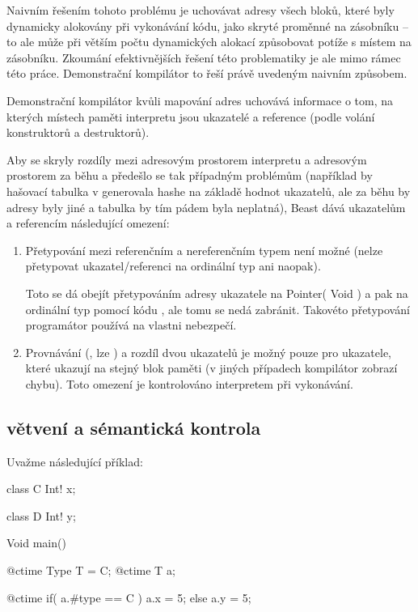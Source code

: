 Naivním řešením tohoto problému je uchovávat adresy všech bloků, které byly dynamicky alokovány při vykonávání \ctime kódu, jako skryté proměnné na zásobníku -- to ale může při větším počtu dynamických alokací způsobovat potíže s místem na zásobníku. Zkoumání efektivnějších řešení této problematiky je ale mimo rámec této práce. Demonstrační kompilátor to řeší právě uvedeným naivním způsobem.

Demonstrační kompilátor kvůli mapování adres uchovává informace o tom, na kterých místech paměti interpretu jsou ukazatelé a reference (podle volání konstruktorů a destruktorů). 

Aby se skryly rozdíly mezi adresovým prostorem interpretu a adresovým prostorem za běhu a předešlo se tak případným problémům (například by hašovací tabulka v \ctime generovala hashe na základě hodnot ukazatelů, ale za běhu by adresy byly jiné a tabulka by tím pádem byla neplatná), Beast dává \ctime ukazatelům a referencím následující omezení:
\begin{enumerate}
	\item Přetypování mezi referenčním a nereferenčním typem není možné (nelze přetypovat ukazatel/referenci na ordinální typ ani naopak).
	
	Toto se dá obejít přetypováním adresy ukazatele na Pointer( Void ) a pak na ordinální typ pomocí kódu , ale tomu se nedá zabránit. Takovéto přetypování programátor používá na vlastni nebezpečí.
	
	\item Provnávání (\inlineCode{< > <= >=}, lze ) a rozdíl dvou ukazatelů je možný pouze pro ukazatele, které ukazují na stejný blok paměti (v jiných případech kompilátor zobrazí chybu). Toto omezení je kontrolováno interpretem při vykonávání.
\end{enumerate}

\subsection{\ctime větvení a sémantická kontrola}

Uvažme následující příklad:
\begin{code}
class C {
	Int! x;
}

class D {
	Int! y;
}
	
Void main() {
	@ctime Type T = C;
	@ctime T a;
	
	@ctime if( a.#type == C )
		a.x = 5;
	else
		a.y = 5; $\label{ctime:impl:branch:1}$
}
\end{code}

